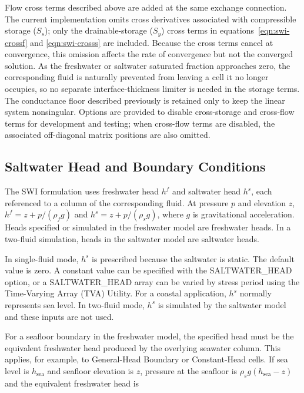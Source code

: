 \noindent Flow cross terms described above are added at the same exchange connection. The current implementation omits cross derivatives associated with compressible storage ($S_{s}$); only the drainable-storage ($S_{y}$) cross terms in equations~\ref{eqn:swi-crossf} and \ref{eqn:swi-crosss} are included. Because the cross terms cancel at convergence, this omission affects the rate of convergence but not the converged solution. As the freshwater or saltwater saturated fraction approaches zero, the corresponding fluid is naturally prevented from leaving a cell it no longer occupies, so no separate interface-thickness limiter is needed in the storage terms. The conductance floor described previously is retained only to keep the linear system nonsingular. Options are provided to disable cross-storage and cross-flow terms for development and testing; when cross-flow terms are disabled, the associated off-diagonal matrix positions are also omitted.

\subsection{Saltwater Head and Boundary Conditions}
\label{sec:swi-bc}

The SWI formulation uses freshwater head $h^{f}$ and saltwater head $h^{s}$, each referenced to a column of the corresponding fluid. At pressure $p$ and elevation $z$, $h^{f}=z+p/(\rho_{f}g)$ and $h^{s}=z+p/(\rho_{s}g)$, where $g$ is gravitational acceleration. Heads specified or simulated in the freshwater model are freshwater heads. In a two-fluid simulation, heads in the saltwater model are saltwater heads.

In single-fluid mode, $h^{s}$ is prescribed because the saltwater is static. The default value is zero. A constant value can be specified with the SALTWATER\_HEAD option, or a SALTWATER\_HEAD array can be varied by stress period using the Time-Varying Array (TVA) Utility. For a coastal application, $h^{s}$ normally represents sea level. In two-fluid mode, $h^{s}$ is simulated by the saltwater model and these inputs are not used.

For a seafloor boundary in the freshwater model, the specified head must be the equivalent freshwater head produced by the overlying seawater column. This applies, for example, to General-Head Boundary or Constant-Head cells. If sea level is $h_{\mathrm{sea}}$ and seafloor elevation is $z$, pressure at the seafloor is $\rho_{s}g(h_{\mathrm{sea}}-z)$ and the equivalent freshwater head is

